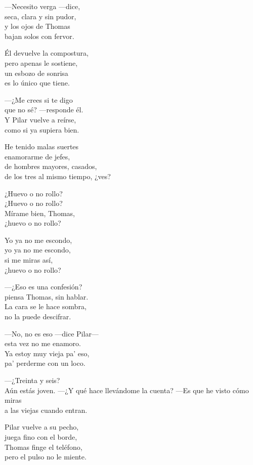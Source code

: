\begin{lyrics}
—Necesito verga —dice,\\
seca, clara y sin pudor,\\
y los ojos de Thomas\\
bajan solos con fervor.

Él devuelve la compostura,\\
pero apenas le sostiene,\\
un esbozo de sonrisa\\
es lo único que tiene.

—¿Me crees si te digo\\
que no sé? —responde él.\\
Y Pilar vuelve a reírse,\\
como si ya supiera bien.

He tenido malas suertes\\
enamorarme de jefes,\\
de hombres mayores, casados,\\
de los tres al mismo tiempo, ¿ves?

¿Huevo o no rollo?\\
¿Huevo o no rollo?\\
Mírame bien, Thomas,\\
¿huevo o no rollo?

Yo ya no me escondo,\\
yo ya no me escondo,\\
si me miras así,\\
¿huevo o no rollo?

—¿Eso es una confesión?\\
piensa Thomas, sin hablar.\\
La cara se le hace sombra,\\
no la puede descifrar.

—No, no es eso —dice Pilar—\\
esta vez no me enamoro.\\
Ya estoy muy vieja pa’ eso,\\
pa’ perderme con un loco.

—¿Treinta y seis?\\
Aún estás joven.
—¿Y qué hace llevándome la cuenta?
—Es que he visto cómo miras\\
a las viejas cuando entran.

Pilar vuelve a su pecho,\\
juega fino con el borde,\\
Thomas finge el teléfono,\\
pero el pulso no le miente.


\end{lyrics}
